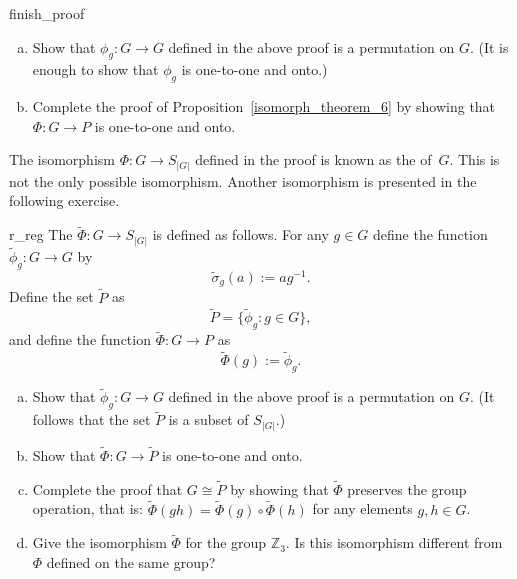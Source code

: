 \begin{exercise}{finish_proof}
\begin{enumerate}[(a)]
\item
Show that $\phi_g : G \rightarrow G$ defined in the above proof is a permutation on $G$. (It is enough to show that $\phi_g$ is one-to-one and onto.) 
\item
Complete the proof of Proposition~\ref{isomorph_theorem_6} by showing that $\Phi:G \rightarrow P$ is one-to-one and onto. 
\end{enumerate}
\end{exercise}

The isomorphism $\Phi: G \rightarrow S_{|G|}$ defined in the proof is known as the  of~$G$. This is not the only possible isomorphism. Another isomorphism is presented in the following exercise.

\begin{exercise}{r_reg}
The   $\tilde{\Phi}: G \rightarrow S_{|G|}$  is defined as follows. For any $g \in G$ define the  function $\tilde{\phi}_g : G \rightarrow G$ by 
\[
\tilde{\sigma}_g(a) := ag^{-1}.
\]
Define the set $\tilde{P}$ as
\[
\tilde{P} = \{ \tilde{\phi}_g : g \in G \},
\]
and define the function $\tilde{\Phi}: G \rightarrow P$ as
\[ \tilde{\Phi}(g) := \tilde{\phi}_g. \]
\begin{enumerate}[(a)]
\item
Show that $\tilde{\phi}_g : G \rightarrow G$ defined in the above proof is a permutation on $G$. (It follows that the set $\tilde{P}$ is a subset of $S_{|G|}$.)
\item
Show that $\tilde{\Phi}:G \rightarrow \tilde{P}$ is one-to-one and onto. 
 \item
Complete the proof that $G \cong \tilde{P}$ by showing that $\tilde{\Phi}$ preserves the group operation, that is: $\tilde{\Phi}(gh) = \tilde{\Phi}(g) \circ \tilde{\Phi}(h)$ for any elements $g, h \in G$.
\item
Give the isomorphism  $\tilde{\Phi}$ for the group $\mathbb{Z}_3$.  Is this isomorphism different from $\Phi$ defined on the same group?
\end{enumerate}
\end{exercise}

\histhead

